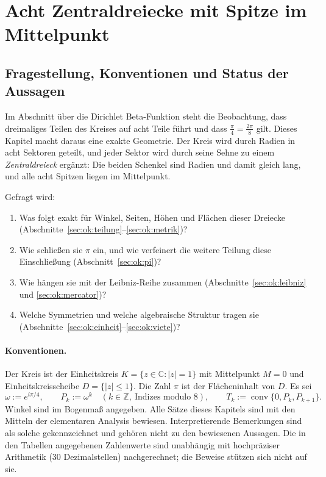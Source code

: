 \documentclass[a4paper,12pt,twoside]{report}
\theoremstyle{definition}
\begin{document}
\section{Acht Zentraldreiecke mit Spitze im Mittelpunkt}
\label{sec:ok}

\subsection{Fragestellung, Konventionen und Status der Aussagen}
\label{sec:ok:frage}

Im Abschnitt über die Dirichlet Beta-Funktion steht die Beobachtung, dass dreimaliges Teilen des Kreises auf acht Teile führt und dass $\frac{\pi}{4}=\frac{2\pi}{8}$ gilt. Dieses Kapitel macht daraus eine exakte Geometrie. Der Kreis wird durch Radien in acht Sektoren geteilt, und jeder Sektor wird durch seine Sehne zu einem \emph{Zentraldreieck} ergänzt: Die beiden Schenkel sind Radien und damit gleich lang, und alle acht Spitzen liegen im Mittelpunkt.

Gefragt wird:
\begin{enumerate}[label=(\arabic*)]
\item Was folgt exakt für Winkel, Seiten, Höhen und Flächen dieser Dreiecke (Abschnitte~\ref{sec:ok:teilung}--\ref{sec:ok:metrik})?
\item Wie schließen sie $\pi$ ein, und wie verfeinert die weitere Teilung diese Einschließung (Abschnitt~\ref{sec:ok:pi})?
\item Wie hängen sie mit der Leibniz-Reihe zusammen (Abschnitte~\ref{sec:ok:leibniz} und \ref{sec:ok:mercator})?
\item Welche Symmetrien und welche algebraische Struktur tragen sie (Abschnitte~\ref{sec:ok:einheit}--\ref{sec:ok:viete})?
\end{enumerate}

\paragraph{Konventionen.}
Der Kreis ist der Einheitskreis $K=\{z\in\mathbb{C}:|z|=1\}$ mit Mittelpunkt $M=0$ und Einheitskreisscheibe $D=\{|z|\le1\}$. Die Zahl $\pi$ ist der Flächeninhalt von $D$. Es sei
\[
\omega:=e^{i\pi/4},\qquad P_k:=\omega^k\quad(k\in\mathbb{Z},\ \text{Indizes modulo }8),\qquad T_k:=\operatorname{conv}\{0,P_k,P_{k+1}\}.
\]
Winkel sind im Bogenmaß angegeben. Alle Sätze dieses Kapitels sind mit den Mitteln der elementaren Analysis bewiesen. Interpretierende Bemerkungen sind als solche gekennzeichnet und gehören nicht zu den bewiesenen Aussagen. Die in den Tabellen angegebenen Zahlenwerte sind unabhängig mit hochpräziser Arithmetik (30 Dezimalstellen) nachgerechnet; die Beweise stützen sich nicht auf sie.
\end{document}
